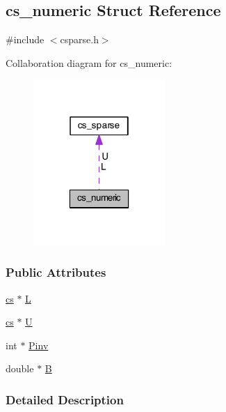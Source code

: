 \hypertarget{structcs__numeric}{\subsection{cs\-\_\-numeric Struct Reference}
\label{structcs__numeric}
}


{\ttfamily \#include $<$csparse.\-h$>$}



Collaboration diagram for cs\-\_\-numeric\-:\nopagebreak
\begin{figure}[H]
\begin{center}
\leavevmode
\includegraphics[width=142pt]{structcs__numeric__coll__graph}
\end{center}
\end{figure}
\subsubsection*{Public Attributes}
\begin{DoxyCompactItemize}
\item 
\hyperlink{csparse_8h_a44e471a015cf32e012cffef17e81b6db}{cs} $\ast$ \hyperlink{structcs__numeric_a93a8cf26f01d3df51b41acc690f120d7}{L}
\item 
\hyperlink{csparse_8h_a44e471a015cf32e012cffef17e81b6db}{cs} $\ast$ \hyperlink{structcs__numeric_a1e07204edb10064ca1e471289fced1cb}{U}
\item 
int $\ast$ \hyperlink{structcs__numeric_a485727ef230d7e61b735fad674135d78}{Pinv}
\item 
double $\ast$ \hyperlink{structcs__numeric_ad81bc354670c58c7e715293e98316152}{B}
\end{DoxyCompactItemize}


\subsubsection{Detailed Description}


